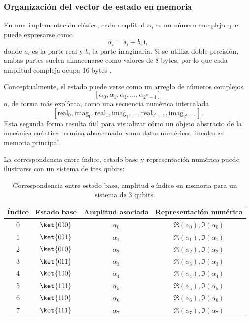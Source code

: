 \subsubsection{Organización del vector de estado en memoria}

En una implementación clásica, cada amplitud $\alpha_i$ es un número complejo que puede expresarse como
\[
    \alpha_i = a_i + b_i\,\mathrm{i},
\]
donde $a_i$ es la parte real y $b_i$ la parte imaginaria. Si se utiliza doble precisión, ambas partes suelen almacenarse como valores de 8 bytes, por lo que cada amplitud compleja ocupa 16 bytes \cite{Jones2019,wu2019full}.

Conceptualmente, el estado puede verse como un arreglo de números complejos
\[
    [\alpha_0,\alpha_1,\alpha_2,\ldots,\alpha_{2^n-1}]
\]
o, de forma más explícita, como una secuencia numérica intercalada
\[
    [\mathrm{real}_0,\mathrm{imag}_0,\mathrm{real}_1,\mathrm{imag}_1,\ldots,\mathrm{real}_{2^n-1},\mathrm{imag}_{2^n-1}].
\]
Esta segunda forma resulta útil para visualizar cómo un objeto abstracto de la mecánica cuántica termina almacenado como datos numéricos lineales en memoria principal.

La correspondencia entre índice, estado base y representación numérica puede ilustrarse con un sistema de tres qubits:

\begin{table}[ht]
    \centering
    \small
    \begin{tabular}{c c c c}
        \hline
        Índice & Estado base & Amplitud asociada & Representación numérica \\
        \hline
        0 & $\ket{000}$ & $\alpha_0$ & $\Re(\alpha_0), \Im(\alpha_0)$ \\
        1 & $\ket{001}$ & $\alpha_1$ & $\Re(\alpha_1), \Im(\alpha_1)$ \\
        2 & $\ket{010}$ & $\alpha_2$ & $\Re(\alpha_2), \Im(\alpha_2)$ \\
        3 & $\ket{011}$ & $\alpha_3$ & $\Re(\alpha_3), \Im(\alpha_3)$ \\
        4 & $\ket{100}$ & $\alpha_4$ & $\Re(\alpha_4), \Im(\alpha_4)$ \\
        5 & $\ket{101}$ & $\alpha_5$ & $\Re(\alpha_5), \Im(\alpha_5)$ \\
        6 & $\ket{110}$ & $\alpha_6$ & $\Re(\alpha_6), \Im(\alpha_6)$ \\
        7 & $\ket{111}$ & $\alpha_7$ & $\Re(\alpha_7), \Im(\alpha_7)$ \\
        \hline
    \end{tabular}
    \caption{Correspondencia entre estado base, amplitud e índice en memoria para un sistema de 3 qubits.}
    \label{tab:estado-base-memoria}
\end{table}

